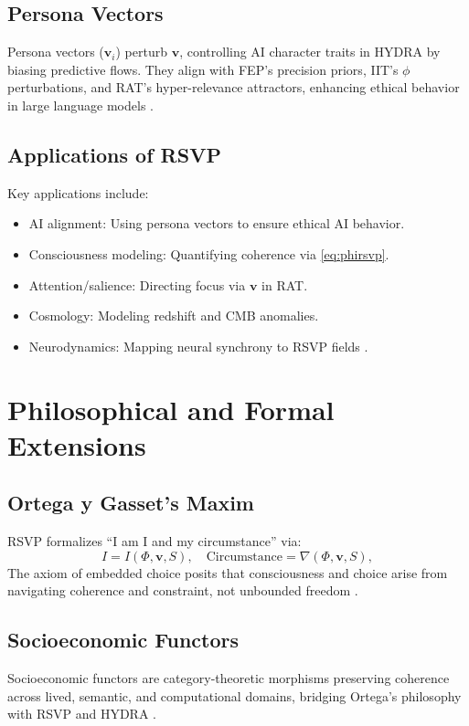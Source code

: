 \documentclass[12pt]{report}
\newcommand{\PhiRSVP}{\Phi}
\newcommand{\vRSVP}{\mathbf{v}}
\newcommand{\SRSVP}{S}
\begin{document}
\section{Persona Vectors}
Persona vectors (\(\mathbf{v}_i\)) perturb \(\vRSVP\), controlling AI character traits in HYDRA by biasing predictive flows. They align with FEP’s precision priors, IIT’s \(\phi\) perturbations, and RAT’s hyper-relevance attractors, enhancing ethical behavior in large language models \citep{Chen2025, HYDRA2025}.

\section{Applications of RSVP}
Key applications include:
\begin{itemize}
    \item AI alignment: Using persona vectors to ensure ethical AI behavior.
    \item Consciousness modeling: Quantifying coherence via \eqref{eq:phirsvp}.
    \item Attention/salience: Directing focus via \(\vRSVP\) in RAT.
    \item Cosmology: Modeling redshift and CMB anomalies.
    \item Neurodynamics: Mapping neural synchrony to RSVP fields \citep{RSVPMeta2025}.
\end{itemize}

\chapter{Philosophical and Formal Extensions}
\section{Ortega y Gasset’s Maxim}
RSVP formalizes “I am I and my circumstance” \citep{Ortega1914} via:
\begin{equation}
I = I(\PhiRSVP, \vRSVP, \SRSVP), \quad \text{Circumstance} = \nabla(\PhiRSVP, \vRSVP, \SRSVP), \label{eq:ortega}
\end{equation}
The axiom of embedded choice posits that consciousness and choice arise from navigating coherence and constraint, not unbounded freedom \citep{SocioeconomicFunctors2025}.

\section{Socioeconomic Functors}
Socioeconomic functors are category-theoretic morphisms preserving coherence across lived, semantic, and computational domains, bridging Ortega’s philosophy with RSVP and HYDRA \citep{SocioeconomicFunctors2025}.
\end{document}
